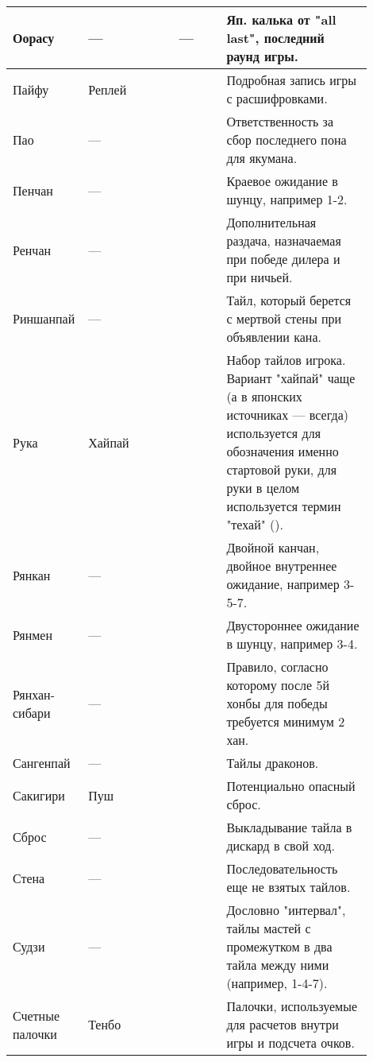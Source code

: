 \begin{tabularx}{\linewidth}{|L{0.14\linewidth}|L{0.13\linewidth}|L{0.1\linewidth}|L{0.13\linewidth}|L{0.4\linewidth}|}
	\hline
	Оорасу & --- &  & --- & Яп. калька от "all last", последний раунд игры. \\
	\hline
	Пайфу & Реплей &  &  & Подробная запись игры с расшифровками. \\
	\hline
	Пао & --- &  &  & Ответственность за сбор последнего пона для якумана. \\
	\hline
	Пенчан & --- &  &  & Краевое ожидание в шунцу, например 1-2. \\
	\hline
	Ренчан & --- &  &  & Дополнительная раздача, назначаемая при победе дилера и при ничьей. \\
	\hline
	Риншанпай & --- &  &   & Тайл, который берется с мертвой стены при объявлении кана. \\
	\hline
	Рука & Хайпай &  &  & Набор тайлов игрока. Вариант "хайпай" чаще (а в японских источниках --- всегда) используется для обозначения именно стартовой руки, для руки в целом используется термин "техай" (). \\
	\hline
	Рянкан & --- &  &  & Двойной канчан, двойное внутреннее ожидание, например 3-5-7. \\
	\hline
	Рянмен & --- &  &  & Двустороннее ожидание в шунцу, например 3-4. \\
	\hline
	Рянхан-сибари & --- &  &   & Правило, согласно которому после 5й хонбы для победы требуется минимум 2 хан. \\
	\hline
	Сангенпай & --- &  &  & Тайлы драконов. \\
	\hline
	Сакигири & Пуш &  &  & Потенциально опасный сброс. \\ 
	\hline
	Сброс & --- &  &  & Выкладывание тайла в дискард в свой ход. \\ 
	\hline
	Стена & --- &  &  & Последовательность еще не взятых тайлов. \\
	\hline
	Судзи & --- &  &  & Дословно "интервал", тайлы мастей с промежутком в два тайла между ними (например, 1-4-7). \\
	\hline
	Счетные палочки & Тенбо &  &  & Палочки, используемые для расчетов внутри игры и подсчета очков. \\

\end{tabularx}
